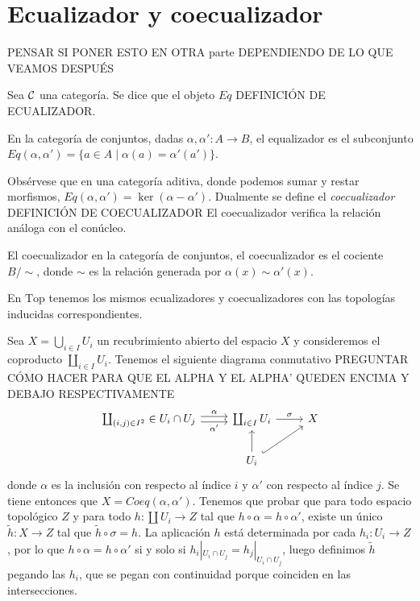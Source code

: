 \documentclass[GA.tex]{subfiles}
\begin{document}
\section{Ecualizador y coecualizador}
PENSAR SI PONER ESTO EN OTRA parte DEPENDIENDO DE LO QUE VEAMOS DESPUÉS

Sea $\mathcal{C}$ una categoría. Se dice que el objeto $Eq$ DEFINICIÓN DE ECUALIZADOR.

\begin{ej}
En la categoría de conjuntos, dadas $\alpha, \alpha': A\to B$, el equalizador es el subconjunto $Eq(\alpha,\alpha')=\{a\in A\mid \alpha(a)=\alpha'(a')\}$. 
\end{ej}
Obsérvese que en una categoría aditiva, donde podemos sumar y restar morfismos, $Eq(\alpha,\alpha')=\ker(\alpha-\alpha')$. Dualmente se define el \emph{coecualizador} DEFINICIÓN DE COECUALIZADOR
El coecualizador verifica la relación análoga con el conúcleo.
\begin{ej}
El coecualizador en la categoría de conjuntos, el coecualizador es el cociente $B/\sim$, donde $\sim$ es la relación generada por $\alpha(x)\sim\alpha'(x)$. 
\end{ej}
\begin{ej}
En $\mathrm{Top}$ tenemos los mismos ecualizadores y coecualizadores con las topologías inducidas correspondientes. 
\end{ej}

Sea $X=\bigcup_{i\in I}U_i$ un recubrimiento abierto del espacio $X$ y consideremos el coproducto $\coprod_{i\in I}U_i$. Tenemos el siguiente diagrama conmutativo PREGUNTAR CÓMO HACER PARA QUE EL ALPHA Y EL ALPHA' QUEDEN ENCIMA Y DEBAJO RESPECTIVAMENTE
\[
\begin{tikzcd}
\coprod_{(i,j)\in I^2}\in U_i\cap U_j\arrow[r, shift left, "\alpha"]\arrow[r, shift right,"\alpha'"']&\coprod_{i\in I}U_i\arrow[r, "\sigma"] & X\\
&U_i\arrow[u]\arrow[ur,hookrightarrow]&
\end{tikzcd}
\]
donde $\alpha$ es la inclusión con respecto al índice $i$ y $\alpha'$ con respecto al índice $j$. Se tiene entonces que $X=Coeq(\alpha,\alpha')$. Tenemos que probar que para todo espacio topológico $Z$ y para todo $h:\coprod U_i\to Z$ tal que $h\circ\alpha=h\circ\alpha'$, existe un único $\tilde{h}: X\to Z$ tal que $\tilde{h}\circ\sigma=h$. La aplicación $h$ está determinada por cada $h_i:U_i\to Z$, por lo que $h\circ \alpha=h\circ\alpha'$ si y solo si $h_i|_{U_i\cap U_j}=h_j|_{U_i\cap U_j}$, luego definimos $\tilde{h}$ pegando las $h_i$, que se pegan con continuidad porque coinciden en las intersecciones.
\end{document}
